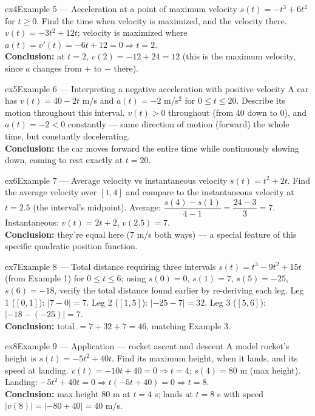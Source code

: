 \documentclass[11pt]{article}
\begin{document}
\begin{example}{ex4}{Example 5 --- Acceleration at a point of maximum velocity}
$s(t)=-t^3+6t^2$ for $t\geq0$. Find the time when velocity is maximized, and the velocity there.\soln
$v(t)=-3t^2+12t$; velocity is maximized where $a(t)=v'(t)=-6t+12=0\Rightarrow t=2$.\\[3pt]\textbf{Conclusion:} at $t=2$, $v(2)=-12+24=12$ (this is the maximum velocity, since $a$ changes from $+$ to $-$ there).
\end{example}

\begin{example}{ex5}{Example 6 --- Interpreting a negative acceleration with positive velocity}
A car has $v(t)=40-2t$ m/s and $a(t)=-2$ m/s$^2$ for $0\leq t\leq20$. Describe its motion throughout this interval.\soln
$v(t)>0$ throughout (from 40 down to 0), and $a(t)=-2<0$ constantly --- same direction of motion (forward) the whole time, but constantly decelerating.\\[3pt]\textbf{Conclusion:} the car moves forward the entire time while continuously slowing down, coming to rest exactly at $t=20$.
\end{example}

\begin{example}{ex6}{Example 7 --- Average velocity vs instantaneous velocity}
$s(t)=t^2+2t$. Find the average velocity over $[1,4]$ and compare to the instantaneous velocity at $t=2.5$ (the interval's midpoint).\soln
Average: $\dfrac{s(4)-s(1)}{4-1}=\dfrac{24-3}{3}=7$. Instantaneous: $v(t)=2t+2$, $v(2.5)=7$.\\[3pt]\textbf{Conclusion:} they're equal here (7 m/s both ways) --- a special feature of this specific quadratic position function.
\end{example}

\begin{example}{ex7}{Example 8 --- Total distance requiring three intervals}
$s(t)=t^3-9t^2+15t$ (from Example 1) for $0\leq t\leq6$; using $s(0)=0$, $s(1)=7$, $s(5)=-25$, $s(6)=-18$, verify the total distance found earlier by re-deriving each leg.\soln
Leg 1 ($[0,1]$): $|7-0|=7$. Leg 2 ($[1,5]$): $|-25-7|=32$. Leg 3 ($[5,6]$): $|-18-(-25)|=7$.\\[3pt]\textbf{Conclusion:} total $=7+32+7=46$, matching Example 3.
\end{example}

\begin{example}{ex8}{Example 9 --- Application --- rocket ascent and descent}
A model rocket's height is $s(t)=-5t^2+40t$. Find its maximum height, when it lands, and its speed at landing.\soln
$v(t)=-10t+40=0\Rightarrow t=4$; $s(4)=80$ m (max height). Landing: $-5t^2+40t=0\Rightarrow t(-5t+40)=0\Rightarrow t=8$.\\[3pt]\textbf{Conclusion:} max height $80$ m at $t=4$ s; lands at $t=8$ s with speed $|v(8)|=|-80+40|=40$ m/s.
\end{example}
\end{document}
